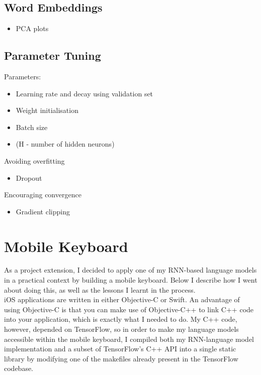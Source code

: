 \documentclass[a4paper, 12pt]{report}
\begin{document}
\subsection{Word Embeddings} \label{embeddings}
\begin{itemize}
\item
	PCA plots
\end{itemize}
\subsection{Parameter Tuning} \label{tuning}

Parameters:
\begin{itemize}
\item
	Learning rate and decay using validation set
\item
	Weight initialisation
\item
	Batch size
\item
	(H - number of hidden neurons)
\end{itemize}

Avoiding overfitting
\begin{itemize}
\item
	Dropout
\end{itemize}

Encouraging convergence
\begin{itemize}
\item
	Gradient clipping
\end{itemize}

\section{Mobile Keyboard} \label{mobile_keyboard}

As a project extension, I decided to apply one of my RNN-based language models in a practical context by building a mobile keyboard. Below I describe how I went about doing this, as well as the lessons I learnt in the process. \\

iOS applications are written in either Objective-C or Swift. An advantage of using Objective-C is that you can make use of Objective-C++ to link C++ code into your application, which is exactly what I needed to do. My C++ code, however, depended on TensorFlow, so in order to make my language models accessible within the mobile keyboard, I compiled both my RNN-language model implementation and a subset of TensorFlow's C++ API into a single static library by modifying one of the makefiles already present in the TensorFlow codebase. \\
\end{document}

